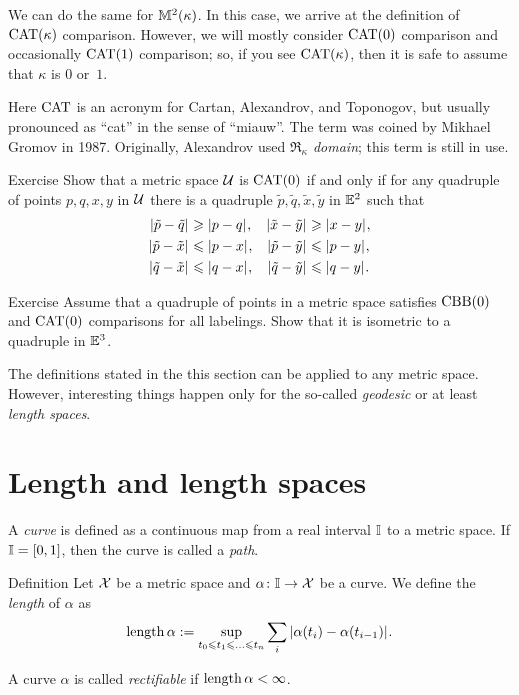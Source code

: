 We can do the same for $\mathbb{M}^2(\kappa)$.
In this case, we arrive at the definition of $\mathrm{CAT}(\kappa)$ comparison.
However, we will mostly consider $\mathrm{CAT}(0)$ comparison and occasionally $\mathrm{CAT}(1)$ comparison;
so, if you see $\mathrm{CAT}(\kappa)$, then it is safe to assume that $\kappa$ is $0$ or~$1$.

Here $\mathrm{CAT}$ is an acronym for Cartan, Alexandrov, and Toponogov,
but usually pronounced as ``cat'' in the sense of ``miauw''.
The term was coined by Mikhael Gromov in 1987.
Originally, Alexandrov used \emph{$\mathfrak{R}_\kappa$ domain};
this term is still in use.

\begin{thm}{Exercise}\label{ex:sba-2+2-short}
Show that a metric space $\mathcal{U}$ is $\mathrm{CAT}(0)$
if and only if for any quadruple of points 
$p,q,x,y$ in $\mathcal{U}$ 
there is a quadruple $\tilde p,\tilde q,\tilde x,\tilde y$ in $\mathbb{E}^2$
such that 
\begin{align*}
\dist{\tilde p}{\tilde q}{}&\ge\dist{p}{q}{},
&
\dist{\tilde x}{\tilde y}{}&\ge\dist{x}{y}{},
\\
\dist{\tilde p}{\tilde x}{}&\le \dist{p}{x}{},
&
\dist{\tilde p}{\tilde y}{}&\le \dist{p}{y}{},
\\
\dist{\tilde q}{\tilde x}{}&\le \dist{q}{x}{},
&
\dist{\tilde q}{\tilde y}{}&\le \dist{q}{y}{}.
\end{align*}

\end{thm}

\begin{thm}{Exercise}\label{ex:CBB+CAT}
Assume that a quadruple of points in a metric space satisfies $\mathrm{CBB}(0)$ and $\mathrm{CAT}(0)$ comparisons for all labelings.
Show that it is isometric to a quadruple in $\mathbb{E}^3$.
\end{thm}

The definitions stated in the this section can be applied to any metric space.
However, interesting things happen only for the so-called \textit{geodesic} or at least \textit{length spaces}.

\section{Length and length spaces}\label{sec:length}

A \emph{curve} is defined as a continuous map from a real interval $\mathbb{I}$ to a metric space.
If $\mathbb{I}=[0,1]$, then the curve is called a \emph{path}.

\begin{thm}{Definition}
Let $\mathcal{X}$ be a metric space and
$\alpha\colon \mathbb{I}\to \mathcal{X}$ be a curve.
We define the \emph{length} of $\alpha$ as 
\[
\length \alpha \df \sup_{t_0\le t_1\le\ldots\le t_n}\sum_i \dist{\alpha(t_i)}{\alpha(t_{i-1})}{}.
\]

A curve $\alpha$ is called \emph{rectifiable} if $\mathop{\rm length}\nolimits \alpha<\infty$.
\end{thm}

